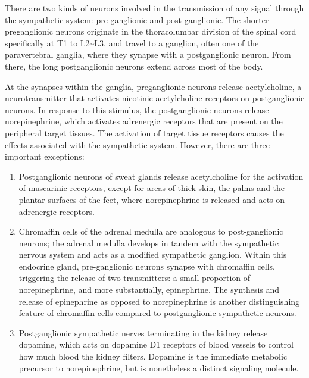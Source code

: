 \documentclass[]{book}
\providecommand{\tightlist}{%
  \setlength{\itemsep}{0pt}\setlength{\parskip}{0pt}}
\begin{document}
There are two kinds of neurons involved in the transmission of any signal through the sympathetic system: pre-ganglionic and post-ganglionic. The shorter preganglionic neurons originate in the thoracolumbar division of the spinal cord specifically at T1 to L2\textasciitilde{}L3, and travel to a ganglion, often one of the paravertebral ganglia, where they synapse with a postganglionic neuron. From there, the long postganglionic neurons extend across most of the body.

At the synapses within the ganglia, preganglionic neurons release acetylcholine, a neurotransmitter that activates nicotinic acetylcholine receptors on postganglionic neurons. In response to this stimulus, the postganglionic neurons release norepinephrine, which activates adrenergic receptors that are present on the peripheral target tissues. The activation of target tissue receptors causes the effects associated with the sympathetic system. However, there are three important exceptions:

\begin{enumerate}
\def\labelenumi{\arabic{enumi}.}
\tightlist
\item
  Postganglionic neurons of sweat glands release acetylcholine for the activation of muscarinic receptors, except for areas of thick skin, the palms and the plantar surfaces of the feet, where norepinephrine is released and acts on adrenergic receptors.
\item
  Chromaffin cells of the adrenal medulla are analogous to post-ganglionic neurons; the adrenal medulla develops in tandem with the sympathetic nervous system and acts as a modified sympathetic ganglion. Within this endocrine gland, pre-ganglionic neurons synapse with chromaffin cells, triggering the release of two transmitters: a small proportion of norepinephrine, and more substantially, epinephrine. The synthesis and release of epinephrine as opposed to norepinephrine is another distinguishing feature of chromaffin cells compared to postganglionic sympathetic neurons.
\item
  Postganglionic sympathetic nerves terminating in the kidney release dopamine, which acts on dopamine D1 receptors of blood vessels to control how much blood the kidney filters. Dopamine is the immediate metabolic precursor to norepinephrine, but is nonetheless a distinct signaling molecule.
\end{enumerate}
\end{document}
